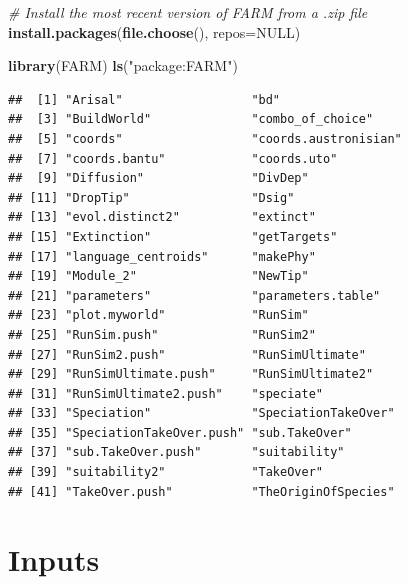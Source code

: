 \documentclass[]{book}
\newenvironment{Shaded}{\begin{snugshade}}{\end{snugshade}}
\newcommand{\KeywordTok}[1]{\textcolor[rgb]{0.13,0.29,0.53}{\textbf{{#1}}}}
\newcommand{\DataTypeTok}[1]{\textcolor[rgb]{0.13,0.29,0.53}{{#1}}}
\newcommand{\StringTok}[1]{\textcolor[rgb]{0.31,0.60,0.02}{{#1}}}
\newcommand{\CommentTok}[1]{\textcolor[rgb]{0.56,0.35,0.01}{\textit{{#1}}}}
\newcommand{\OtherTok}[1]{\textcolor[rgb]{0.56,0.35,0.01}{{#1}}}
\newcommand{\NormalTok}[1]{{#1}}
\theoremstyle{definition}
\theoremstyle{definition}
\theoremstyle{definition}
\theoremstyle{remark}
\begin{document}
\begin{Shaded}
\begin{Highlighting}[]
\CommentTok{# Install the most recent version of FARM from a .zip file}
\KeywordTok{install.packages}\NormalTok{(}\KeywordTok{file.choose}\NormalTok{(), }\DataTypeTok{repos=}\OtherTok{NULL}\NormalTok{) }
\end{Highlighting}
\end{Shaded}

\begin{Shaded}
\begin{Highlighting}[]
\KeywordTok{library}\NormalTok{(FARM)}
\KeywordTok{ls}\NormalTok{(}\StringTok{"package:FARM"}\NormalTok{)}
\end{Highlighting}
\end{Shaded}

\begin{verbatim}
##  [1] "Arisal"                  "bd"                     
##  [3] "BuildWorld"              "combo_of_choice"        
##  [5] "coords"                  "coords.austronisian"    
##  [7] "coords.bantu"            "coords.uto"             
##  [9] "Diffusion"               "DivDep"                 
## [11] "DropTip"                 "Dsig"                   
## [13] "evol.distinct2"          "extinct"                
## [15] "Extinction"              "getTargets"             
## [17] "language_centroids"      "makePhy"                
## [19] "Module_2"                "NewTip"                 
## [21] "parameters"              "parameters.table"       
## [23] "plot.myworld"            "RunSim"                 
## [25] "RunSim.push"             "RunSim2"                
## [27] "RunSim2.push"            "RunSimUltimate"         
## [29] "RunSimUltimate.push"     "RunSimUltimate2"        
## [31] "RunSimUltimate2.push"    "speciate"               
## [33] "Speciation"              "SpeciationTakeOver"     
## [35] "SpeciationTakeOver.push" "sub.TakeOver"           
## [37] "sub.TakeOver.push"       "suitability"            
## [39] "suitability2"            "TakeOver"               
## [41] "TakeOver.push"           "TheOriginOfSpecies"
\end{verbatim}

\section{Inputs}\label{inputs}
\end{document}
